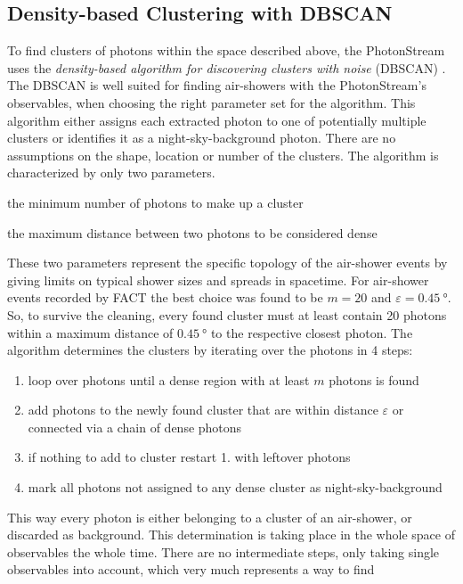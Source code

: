 \subsection{Density-based Clustering with DBSCAN}
%
To find clusters of photons within the space described above, the PhotonStream
uses the \textit{density-based algorithm for discovering clusters with noise}
(DBSCAN) \cite{DBSCAN}. The DBSCAN is well suited for finding air-showers with the
PhotonStream's observables, when choosing the right parameter set for the algorithm. This
algorithm either assigns each extracted photon to one of potentially multiple
clusters or identifies it as a night-sky-background photon. There are no
assumptions on the shape, location or number of the clusters. The algorithm is
characterized by only two parameters.
%
\begin{description}[]
  \item[m] the minimum number of photons to make up a cluster
  \item[$\symbf{\varepsilon}$] the maximum distance between two photons to be considered dense
\end{description}
%
These two parameters represent the specific topology of the air-shower events
by giving limits on typical shower sizes and spreads in spacetime. For
air-shower events recorded by FACT the best choice was found to be $m = 20$ and
$\varepsilon = \SI{0.45}{\degree}$. So, to survive the cleaning, every found
cluster must at least contain 20 photons within a maximum distance of
$\SI{0.45}{\degree}$ to the respective closest photon. The algorithm determines
the clusters by iterating over the photons in 4 steps:
%
\begin{enumerate}
  \item loop over photons until a dense region with at least $m$ photons is found
  \item add photons to the newly found cluster that are within distance $\varepsilon$ or connected via a chain of dense photons
  \item if nothing to add to cluster restart 1. with leftover photons
  \item mark all photons not assigned to any dense cluster as night-sky-background
\end{enumerate}
%
This way every photon is either belonging to a cluster of an air-shower, or
discarded as background. This determination is taking place in the whole space
of observables the whole time. There are no intermediate steps, only taking
single observables into account, which very much represents a way to find
